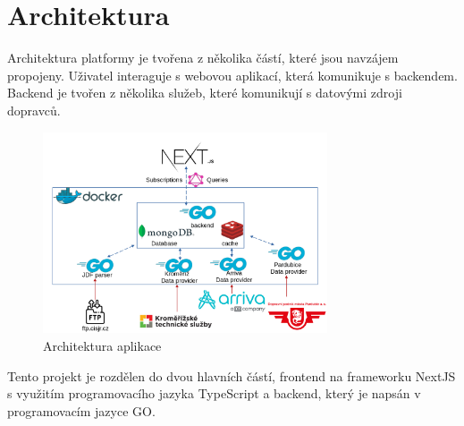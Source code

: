 \section{Architektura}
Architektura platformy je tvořena z několika částí, které jsou navzájem propojeny. Uživatel interaguje s webovou aplikací, která komunikuje s backendem. Backend je tvořen z několika služeb, které komunikují s datovými zdroji dopravců.
\par
\begin{figure}[H]
    \centering
    \includegraphics[width=0.75\textwidth]{images/architekturaV5.png}
    \caption{Architektura aplikace}
    \label{architektura}
\end{figure}
\par
Tento projekt je rozdělen do dvou hlavních částí, frontend na frameworku NextJS s využitím programovacího jazyka TypeScript a backend, který je napsán v programovacím jazyce GO.
